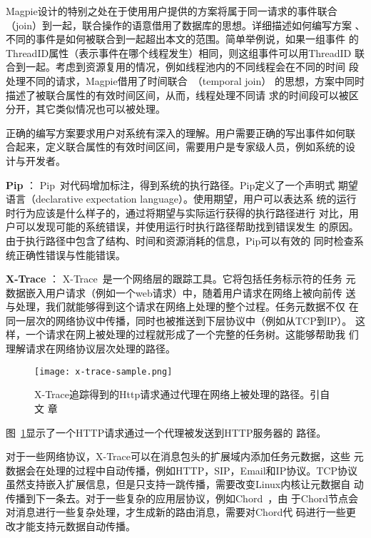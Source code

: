 Magpie设计的特别之处在于使用用户提供的方案将属于同一请求的事件联合
（join）到一起，联合操作的语意借用了数据库的思想。详细描述如何编写方案
、不同的事件是如何被联合到一起超出本文的范围。简单举例说，如果一组事件
的ThreadID属性（表示事件在哪个线程发生）相同，则这组事件可以用ThreadID
联合到一起。考虑到资源复用的情况，例如线程池内的不同线程会在不同的时间
段处理不同的请求，Magpie借用了时间联合~\cite{Gao2005}（temporal join）
的思想，方案中同时描述了被联合属性的有效时间区间，从而，线程处理不同请
求的时间段可以被区分开，其它类似情况也可以被处理。

正确的编写方案要求用户对系统有深入的理解。用户需要正确的写出事件如何联
合起来，定义联合属性的有效时间区间，需要用户是专家级人员，例如系统的设
计与开发者。

\textbf{Pip} ：
Pip~\cite{pip}对代码增加标注，得到系统的执行路径。Pip定义了一个声明式
期望语言（declarative expectation language）。使用期望，用户可以表达系
统的运行时行为应该是什么样子的，通过将期望与实际运行获得的执行路径进行
对比，用户可以发现可能的系统错误，并使用运行时执行路径帮助找到错误发生
的原因。由于执行路径中包含了结构、时间和资源消耗的信息，Pip可以有效的
同时检查系统正确性错误与性能错误。


\textbf{X-Trace} ：
X-Trace~\cite{x-trace}是一个网络层的跟踪工具。它将包括任务标示符的任务
元数据嵌入用户请求（例如一个web请求）中，随着用户请求在网络上被向前传
送与处理，我们就能够得到这个请求在网络上处理的整个过程。任务元数据不仅
在同一层次的网络协议中传播，同时也被推送到下层协议中（例如从TCP到IP）。
这样，一个请求在网上被处理的过程就形成了一个完整的任务树。这能够帮助我
们理解请求在网络协议层次处理的路径。

\begin{figure}
\centering
\begin{minipage}{0.8\linewidth}
\texttt{[image: x-trace-sample.png]}
\caption{X-Trace追踪得到的Http请求通过代理在网络上被处理的路径。引自文
章~\cite{x-trace}}
\label{fig:x-trace}
\end{minipage}
\end{figure}

图~\ref{fig:x-trace}显示了一个HTTP请求通过一个代理被发送到HTTP服务器的
路径。

对于一些网络协议，X-Trace可以在消息包头的扩展域内添加任务元数据，这些
元数据会在处理的过程中自动传播，例如HTTP，SIP，Email和IP协议。TCP协议
虽然支持嵌入扩展信息，但是只支持一跳传播，需要改变Linux内核让元数据自
动传播到下一条去。对于一些复杂的应用层协议，例如Chord~\cite{chord}，由
于Chord节点会对消息进行一些复杂处理，才生成新的路由消息，需要对Chord代
码进行一些更改才能支持元数据自动传播。

